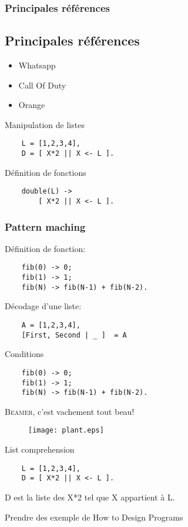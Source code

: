 \documentclass[notes=only]{beamer}
\begin{document}
\begin{frame}
  \frametitle{Principales références}
  \subsection[Références]{Principales références}

  \begin{itemize}
  \item Whatsapp
  \item Call Of Duty
  \item Orange
  \end{itemize}

\end{frame}

\begin{frame}[fragile]
  Manipulation de listes
  \begin{verbatim}
    L = [1,2,3,4],
    D = [ X*2 || X <- L ].
  \end{verbatim}
\end{frame}

\begin{frame}[fragile]
  Définition de fonctions
  \begin{verbatim}
    double(L) ->
        [ X*2 || X <- L ].
  \end{verbatim}
\end{frame}

\begin{frame}[fragile]
  \frametitle{Pattern maching}
  Définition de fonction:
  \begin{verbatim}
    fib(0) -> 0;
    fib(1) -> 1;
    fib(N) -> fib(N-1) + fib(N-2).
  \end{verbatim}

  Décodage d'une liste:
  \begin{verbatim}
    A = [1,2,3,4],
    [First, Second | _ ]  = A
  \end{verbatim}

\end{frame}

\begin{frame}[fragile]
  Conditions
  \begin{verbatim}
    fib(0) -> 0;
    fib(1) -> 1;
    fib(N) -> fib(N-1) + fib(N-2).
  \end{verbatim}
\end{frame}

\begin{frame}
  \textsc{Beamer}, c'est vachement tout beau!
  \begin{figure}
    \texttt{[image: plant.eps]}
  \end{figure}
\end{frame}

\begin{frame}[fragile]
  List comprehension

  \begin{verbatim}
    L = [1,2,3,4],
    D = [ X*2 || X <- L ].
  \end{verbatim}

  D est la liste des X*2 tel que X appartient à L.
\end{frame}


\begin{frame}
  Prendre des exemple de How to Design Programs
\end{frame}
\end{document}
